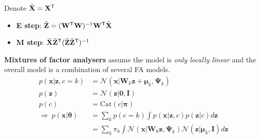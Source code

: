 \begin{example}
    Denote $\Tilde{\mathbf{X}} = \mathbf{X}^\mathsf{T}$
    \begin{itemize}
        \item \textbf{E step}: $\Tilde{\mathbf{Z}} = (\mathbf{W}^\mathsf{T}\mathbf{W})^{-1}\mathbf{W}^\mathsf{T}\Tilde{\mathbf{X}}$ 
        \item \textbf{M step}: $\Tilde{\mathbf{X}}\Tilde{\mathbf{Z}}^\mathsf{T}(\Tilde{\mathbf{Z}}\Tilde{\mathbf{Z}}^\mathsf{T})^{-1}$
    \end{itemize}
\end{example}




\textbf{Mixtures of factor analysers} assume the model is \textit{only locally linear} and 
the overall model is a combination of several FA models.
\begin{align}
    p(\bm{x}|\bm{z},c=k) 
    & = \mathcal{N}(\bm{x}|\mathbf{W}_k\bm{z}+\bm{\mu}_k,\mathbf{\Psi}_k) \\
    p(\bm{z}) 
    & = \mathcal{N}(\bm{z}|\mathbf{0},\mathbf{I}) \\
    p(c) 
    & = \mathrm{Cat}(c|\bm{\pi}) \\
    \Rightarrow~p(\bm{x}|\bm{\theta})
    & = \sum_k p(c=k)\int p(\bm{x}|\bm{z},c)p(\bm{z}|c)d\bm{z} \\
    & = \sum_k \pi_k\int \mathcal{N}(\bm{x}|\mathbf{W}_k\bm{z},\mathbf{\Psi}_k)\mathcal{N}(\bm{z}|\bm{\mu}_k,\mathbf{I}) d\bm{z}
\end{align}


